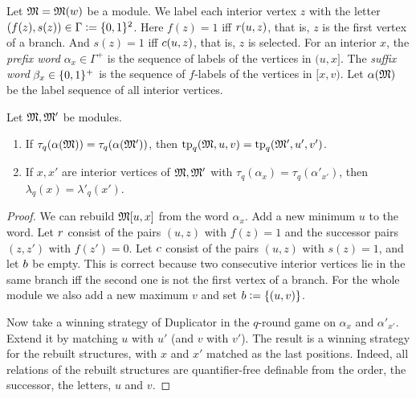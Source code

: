 Let $\mathfrak{M} = \mathfrak{M}(w)$ be a module.
We label each interior vertex $z$ with the letter $(f(z), s(z)) \in \Gamma \mathrel{\vcentcolon=} \{0,1\}^{2}$.
Here $f(z) = 1$ iff $r(u, z)$, that is, $z$ is the first vertex of a branch.
And $s(z) = 1$ iff $c(u, z)$, that is, $z$ is selected.
For an interior $x$, the \emph{prefix word} $\alpha_x \in \Gamma^{+}$ is the sequence of labels of the vertices in $(u, x]$.
The \emph{suffix word} $\beta_x \in \{0,1\}^{+}$ is the sequence of $f$-labels of the vertices in $[x, v)$.
Let $\alpha(\mathfrak{M})$ be the label sequence of all interior vertices.

\begin{lemma}[Prefixes]\label{lemma: prefixes}
  Let $\mathfrak{M}, \mathfrak{M}'$ be modules.
  \begin{enumerate}
    \item If $\tau_q(\alpha(\mathfrak{M})) = \tau_q(\alpha(\mathfrak{M}'))$, then $\mathrm{tp}_{q}(\mathfrak{M}, u, v) = \mathrm{tp}_{q}(\mathfrak{M}', u', v')$.
    \item If $x, x'$ are interior vertices of $\mathfrak{M}, \mathfrak{M}'$ with $\tau_q(\alpha_x) = \tau_q(\alpha'_{x'})$, then $\lambda_q(x) = \lambda'_q(x')$.
  \end{enumerate}
\end{lemma}
\begin{proof}
  We can rebuild $\mathfrak{M}[u, x]$ from the word $\alpha_x$.
  Add a new minimum $u$ to the word.
  Let $r$ consist of the pairs $(u, z)$ with $f(z) = 1$ and the successor pairs $(z, z')$ with $f(z') = 0$.
  Let $c$ consist of the pairs $(u, z)$ with $s(z) = 1$, and let $b$ be empty.
  This is correct because two consecutive interior vertices lie in the same branch iff the second one is not the first vertex of a branch.
  For the whole module we also add a new maximum $v$ and set $b \mathrel{\vcentcolon=} \{(u, v)\}$.

  Now take a winning strategy of Duplicator in the $q$-round game on $\alpha_x$ and $\alpha'_{x'}$.
  Extend it by matching $u$ with $u'$ (and $v$ with $v'$).
  The result is a winning strategy for the rebuilt structures, with $x$ and $x'$ matched as the last positions.
  Indeed, all relations of the rebuilt structures are quantifier-free definable from the order, the successor, the letters, $u$ and $v$.
\end{proof}

